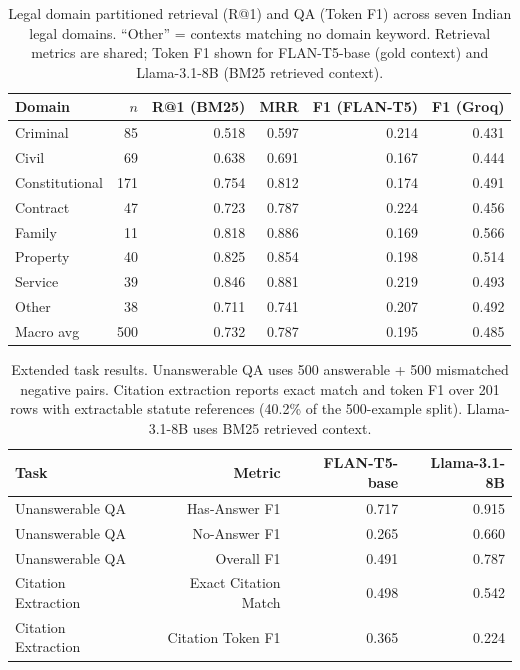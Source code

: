 \documentclass{article}
\begin{document}
\begin{table}[h]
\centering
\caption{Legal domain partitioned retrieval (R@1) and QA (Token F1) across seven Indian legal domains. ``Other'' = contexts matching no domain keyword. Retrieval metrics are shared; Token F1 shown for FLAN-T5-base (gold context) and Llama-3.1-8B (BM25 retrieved context).}
\label{tab:domain}
\begin{tabular}{lrrrrr}
\toprule
Domain & $n$ & R@1 (BM25) & MRR & F1 (FLAN-T5) & F1 (Groq) \\
\midrule
Criminal & 85 & 0.518 & 0.597 & 0.214 & 0.431 \\
Civil & 69 & 0.638 & 0.691 & 0.167 & 0.444 \\
Constitutional & 171 & 0.754 & 0.812 & 0.174 & 0.491 \\
Contract & 47 & 0.723 & 0.787 & 0.224 & 0.456 \\
Family & 11 & 0.818 & 0.886 & 0.169 & 0.566 \\
Property & 40 & 0.825 & 0.854 & 0.198 & 0.514 \\
Service & 39 & 0.846 & 0.881 & 0.219 & 0.493 \\
Other & 38 & 0.711 & 0.741 & 0.207 & 0.492 \\
\midrule
Macro avg & 500 & 0.732 & 0.787 & 0.195 & 0.485 \\
\bottomrule
\end{tabular}
\end{table}

\begin{table}[h]
\centering
\caption{Extended task results. Unanswerable QA uses 500 answerable + 500 mismatched negative pairs. Citation extraction reports exact match and token F1 over 201 rows with extractable statute references (40.2\% of the 500-example split). Llama-3.1-8B uses BM25 retrieved context.}
\label{tab:extended}
\begin{tabular}{lrrr}
\toprule
Task & Metric & FLAN-T5-base & Llama-3.1-8B \\
\midrule
Unanswerable QA & Has-Answer F1 & 0.717 & 0.915 \\
Unanswerable QA & No-Answer F1 & 0.265 & 0.660 \\
Unanswerable QA & Overall F1 & 0.491 & 0.787 \\
\midrule
Citation Extraction & Exact Citation Match & 0.498 & 0.542 \\
Citation Extraction & Citation Token F1 & 0.365 & 0.224 \\
\bottomrule
\end{tabular}
\end{table}
\end{document}
